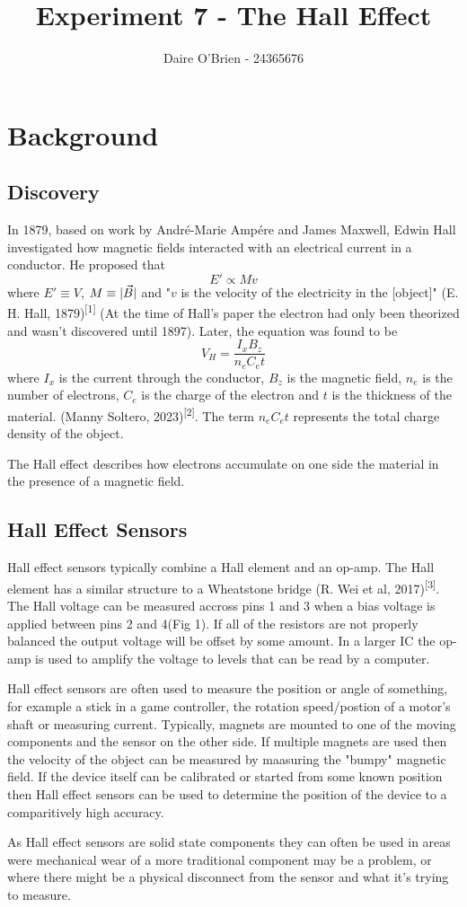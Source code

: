 \documentclass{article}
\title{Experiment 7 - The Hall Effect}
\author{Daire O'Brien - 24365676}
\begin{document}
\maketitle
    \section{Background}
        \subsection{Discovery}
            In 1879, based on work by André-Marie Ampére and James Maxwell, Edwin Hall investigated how magnetic fields interacted with an electrical current in a conductor. He proposed that 
                \[E' \propto Mv\]
            where $E' \equiv V$, $M \equiv \lvert\vec B\rvert$ and "$v$ is the velocity of the electricity in the [object]" (E. H. Hall, 1879)\textsuperscript{[1]} (At the time of Hall's paper the electron had only been theorized and wasn't discovered until 1897). Later, the equation was found to be
                \[V_H = \frac {I_x B_z}{n_e C_e t}\]
            where $I_x$ is the current through the conductor, $B_z$ is the magnetic field, $n_e$ is the number of electrons, $C_e$ is the charge of the electron and $t$ is the thickness of the material. (Manny Soltero, 2023)\textsuperscript{[2]}. The term $n_e C_e t$ represents the total charge density of the object. \par
            The Hall effect describes how electrons accumulate on one side the material in the presence of a magnetic field.

        \subsection{Hall Effect Sensors}
            Hall effect sensors typically combine a Hall element and an op-amp. The Hall element has a similar structure to a Wheatstone bridge (R. Wei et al, 2017)\textsuperscript{[3]}. The Hall voltage can be measured accross pins 1 and 3 when a bias voltage is applied between pins 2 and 4(Fig 1). If all of the resistors are not properly balanced the output voltage will be offset by some amount. In a larger IC the op-amp is used to amplify the voltage to levels that can be read by a computer.  \par
            Hall effect sensors are often used to measure the position or angle of something, for example a stick in a game controller, the rotation speed/postion of a motor's shaft or measuring current. Typically, magnets are mounted to one of the moving components and the sensor on the other side. If multiple magnets are used then the velocity of the object can be measured by maasuring the "bumpy" magnetic field. If the device itself can be calibrated or started from some known position then Hall effect sensors can be used to determine the position of the device to a comparitively high accuracy. \par
            As Hall effect sensors are solid state components they can often be used in areas were mechanical wear of a more traditional component may be a problem, or where there might be a physical disconnect from the sensor and what it's trying to measure.
\end{document}
